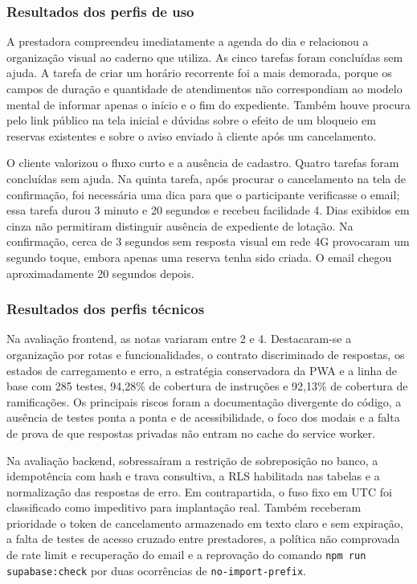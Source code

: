\subsubsection{Resultados dos perfis de uso}

A prestadora compreendeu imediatamente a agenda do dia e relacionou a organização visual ao caderno que utiliza. As cinco tarefas foram concluídas sem ajuda. A tarefa de criar um horário recorrente foi a mais demorada, porque os campos de duração e quantidade de atendimentos não correspondiam ao modelo mental de informar apenas o início e o fim do expediente. Também houve procura pelo link público na tela inicial e dúvidas sobre o efeito de um bloqueio em reservas existentes e sobre o aviso enviado à cliente após um cancelamento.

O cliente valorizou o fluxo curto e a ausência de cadastro. Quatro tarefas foram concluídas sem ajuda. Na quinta tarefa, após procurar o cancelamento na tela de confirmação, foi necessária uma dica para que o participante verificasse o email; essa tarefa durou 3 minuto e 20 segundos e recebeu facilidade 4. Dias exibidos em cinza não permitiram distinguir ausência de expediente de lotação. Na confirmação, cerca de 3 segundos sem resposta visual em rede 4G provocaram um segundo toque, embora apenas uma reserva tenha sido criada. O email chegou aproximadamente 20 segundos depois.

\subsubsection{Resultados dos perfis técnicos}

Na avaliação frontend, as notas variaram entre 2 e 4. Destacaram-se a organização por rotas e funcionalidades, o contrato discriminado de respostas, os estados de carregamento e erro, a estratégia conservadora da PWA e a linha de base com 285 testes, 94,28\% de cobertura de instruções e 92,13\% de cobertura de ramificações. Os principais riscos foram a documentação divergente do código, a ausência de testes ponta a ponta e de acessibilidade, o foco dos modais e a falta de prova de que respostas privadas não entram no cache do service worker.

Na avaliação backend, sobressaíram a restrição de sobreposição no banco, a idempotência com hash e trava consultiva, a RLS habilitada nas tabelas e a normalização das respostas de erro. Em contrapartida, o fuso fixo em UTC foi classificado como impeditivo para implantação real. Também receberam prioridade o token de cancelamento armazenado em texto claro e sem expiração, a falta de testes de acesso cruzado entre prestadores, a política não comprovada de rate limit e recuperação do email e a reprovação do comando \texttt{npm run supabase:check} por duas ocorrências de \texttt{no-import-prefix}.

